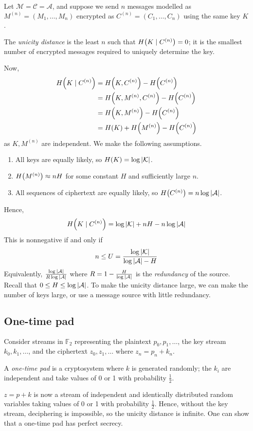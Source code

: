 Let \( \mathcal M = \mathcal C = \mathcal A \), and suppose we send \( n \) messages modelled as \( M^{(n)} = (M_1, \dots, M_n) \) encrypted as \( C^{(n)} = (C_1, \dots, C_n) \) using the same key \( K \).
\begin{definition}
    The \emph{unicity distance} is the least \( n \) such that \( H\qty(K \mid C^{(n)}) = 0 \); it is the smallest number of encrypted messages required to uniquely determine the key.
\end{definition}
Now,
\begin{align*}
    H\qty(K \mid C^{(n)}) &= H\qty(K, C^{(n)}) - H\qty(C^{(n)}) \\
    &= H\qty(K, M^{(n)}, C^{(n)}) - H\qty(C^{(n)}) \\
    &= H\qty(K, M^{(n)}) - H\qty(C^{(n)}) \\
    &= H(K) + H\qty(M^{(n)}) - H\qty(C^{(n)})
\end{align*}
as \( K, M^{(n)} \) are independent.
We make the following assumptions.
\begin{enumerate}
    \item All keys are equally likely, so \( H(K) = \log \abs{\mathcal K} \).
    \item \( H\qty(M^{(n)}) \approx nH \) for some constant \( H \) and sufficiently large \( n \).
    \item All sequences of ciphertext are equally likely, so \( H\qty(C^{(n)}) = n \log \abs{\mathcal A} \).
\end{enumerate}
Hence,
\[ H\qty(K \mid C^{(n)}) = \log \abs{\mathcal K} + nH - n \log \abs{\mathcal A} \]
This is nonnegative if and only if
\[ n \leq U = \frac{\log \abs{\mathcal K}}{\log \abs{\mathcal A} - H} \]
Equivalently, \( \frac{\log \abs{\mathcal A}}{R\log \abs{\mathcal A}} \) where \( R = 1 - \frac{H}{\log \abs{\mathcal A}} \) is the \emph{redundancy} of the source.
Recall that \( 0 \leq H \leq \log \abs{\mathcal A} \).
To make the unicity distance large, we can make the number of keys large, or use a message source with little redundancy.

\subsection{One-time pad}
Consider streams in \( \mathbb F_2 \) representing the plaintext \( p_0, p_1, \dots \), the key stream \( k_0, k_1, \dots \), and the ciphertext \( z_0, z_1, \dots \) where \( z_n = p_n + k_n \).
\begin{definition}
    A \emph{one-time pad} is a cryptosystem where \( k \) is generated randomly; the \( k_i \) are independent and take values of 0 or 1 with probability \( \frac{1}{2} \).
\end{definition}
\( z = p + k \) is now a stream of independent and identically distributed random variables taking values of 0 or 1 with probability \( \frac{1}{2} \).
Hence, without the key stream, deciphering is impossible, so the unicity distance is infinite.
One can show that a one-time pad has perfect secrecy.

